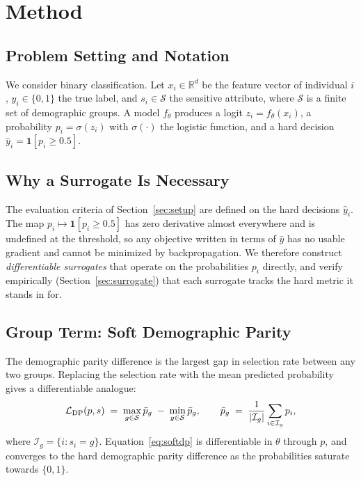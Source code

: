 \section{Method}
\label{sec:method}

\subsection{Problem Setting and Notation}

We consider binary classification. Let $x_i \in \mathbb{R}^d$ be the feature
vector of individual $i$, $y_i \in \{0,1\}$ the true label, and
$s_i \in \mathcal{S}$ the sensitive attribute, where $\mathcal{S}$ is a finite
set of demographic groups. A model $f_\theta$ produces a logit
$z_i = f_\theta(x_i)$, a probability $p_i = \sigma(z_i)$ with
$\sigma(\cdot)$ the logistic function, and a hard decision
$\hat{y}_i = \mathbf{1}[p_i \geq 0.5]$.

\subsection{Why a Surrogate Is Necessary}

The evaluation criteria of Section~\ref{sec:setup} are defined on the hard
decisions $\hat{y}_i$. The map $p_i \mapsto \mathbf{1}[p_i \geq 0.5]$ has zero
derivative almost everywhere and is undefined at the threshold, so any
objective written in terms of $\hat{y}$ has no usable gradient and cannot be
minimized by backpropagation. We therefore construct \emph{differentiable
surrogates} that operate on the probabilities $p_i$ directly, and verify
empirically (Section~\ref{sec:surrogate}) that each surrogate tracks the hard
metric it stands in for.

\subsection{Group Term: Soft Demographic Parity}

The demographic parity difference is the largest gap in selection rate between
any two groups. Replacing the selection rate with the mean predicted
probability gives a differentiable analogue:
\begin{equation}
\mathcal{L}_{\mathrm{DP}}(p, s) \;=\; \max_{g \in \mathcal{S}} \bar{p}_g \;-\; \min_{g \in \mathcal{S}} \bar{p}_g ,
\qquad
\bar{p}_g \;=\; \frac{1}{|\mathcal{I}_g|}\sum_{i \in \mathcal{I}_g} p_i ,
\label{eq:softdp}
\end{equation}
where $\mathcal{I}_g = \{ i : s_i = g \}$. Equation~\eqref{eq:softdp} is
differentiable in $\theta$ through $p$, and converges to the hard demographic
parity difference as the probabilities saturate towards $\{0,1\}$.

